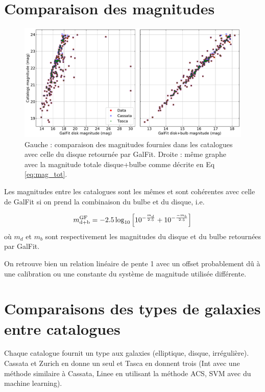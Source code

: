 \documentclass[10pt,a4paper,notitlepage]{article}
\author{Mercier Wilfried}
\begin{document}
\section{Comparaison des magnitudes}

    \begin{figure}[h]
	    \includegraphics[width=\linewidth]{catalogMag_against_GalfitMag_corrected.pdf}	
	    \caption{Gauche : comparaison des magnitudes fournies dans les catalogues avec celle du disque retournée par GalFit. Droite : même graphe avec la magnitude totale disque+bulbe comme décrite en Eq\,\ref{eq:mag_tot}.}
    \end{figure}
    
    Les magnitudes entre les catalogues sont les mêmes et sont cohérentes avec celle de GalFit si on prend la combinaison du bulbe et du disque, i.e.
    
    \begin{equation}
        \label{eq:mag_tot}
        m^{\rm{GF}}_{\rm{d+b}} = -2.5 \log_{10}\left [ 10^{-\frac{m_d}{2.5}} + 10^{-\frac{-m_b}{2.5}} \right ]
    \end{equation}
    où $m_d$ et $m_b$ sont respectivement les magnitudes du disque et du bulbe retournées par GalFit.    
    
    On retrouve bien un relation linéaire de pente 1 avec un offset probablement dû à une calibration ou une constante du système de magnitude utilisée différente.
    
    \newpage
    
    \section{Comparaisons des types de galaxies entre catalogues}
    
    Chaque catalogue fournit un type aux galaxies (elliptique, disque, irrégulière). Cassata et Zurich en donne un seul et Tasca en donnent trois (Int avec une méthode similaire à Cassata, Linee en utilisant la méthode ACS, SVM avec du machine learning).
    
\end{document}
